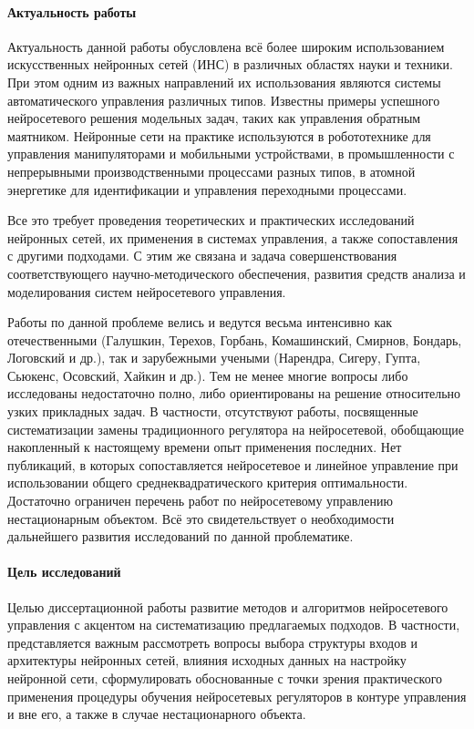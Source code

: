 
\paragraph{Актуальность работы}
Актуальность данной работы обусловлена всё более широким
использованием искусственных нейронных сетей (ИНС) в различных
областях науки и техники.  При этом одним из важных направлений их
использования являются системы автоматического управления различных
типов.  Известны примеры успешного нейросетевого решения модельных
задач, таких как управления обратным маятником.  Нейронные сети на
практике используются в робототехнике для управления манипуляторами и
мобильными устройствами, в промышленности с непрерывными
производственными процессами разных типов, в атомной энергетике для
идентификации и управления переходными процессами.

Все это требует проведения теоретических и практических исследований
нейронных сетей, их применения в системах управления, а также
сопоставления с другими подходами.  С этим же связана и задача
совершенствования соответствующего научно-методического обеспечения,
развития средств анализа и моделирования систем нейросетевого
управления.

Работы по данной проблеме велись и ведутся весьма интенсивно как
отечественными (Галушкин, Терехов, Горбань, Комашинский, Смирнов,
Бондарь, Логовский и др.), так и зарубежными учеными (Нарендра,
Сигеру, Гупта, Сьюкенс, Осовский, Хайкин и др.). Тем не менее многие
вопросы либо исследованы недостаточно полно, либо ориентированы на
решение относительно узких прикладных задач.  В частности, отсутствуют
работы, посвященные систематизации замены традиционного регулятора на
нейросетевой, обобщающие накопленный к настоящему времени опыт
применения последних.  Нет публикаций, в которых сопоставляется
нейросетевое и линейное управление при использовании общего
среднеквадратического критерия оптимальности.  Достаточно ограничен
перечень работ по нейросетевому управлению нестационарным объектом.
Всё это свидетельствует о необходимости дальнейшего развития
исследований по данной проблематике.

\paragraph{Цель исследований}
Целью диссертационной работы развитие методов и алгоритмов
нейросетевого управления с акцентом на систематизацию предлагаемых
подходов.  В частности, представляется важным рассмотреть вопросы
выбора структуры входов и архитектуры нейронных сетей, влияния
исходных данных на настройку нейронной сети, сформулировать
обоснованные с точки зрения практического применения процедуры
обучения нейросетевых регуляторов в контуре управления и вне его, а
также в случае нестационарного объекта.

